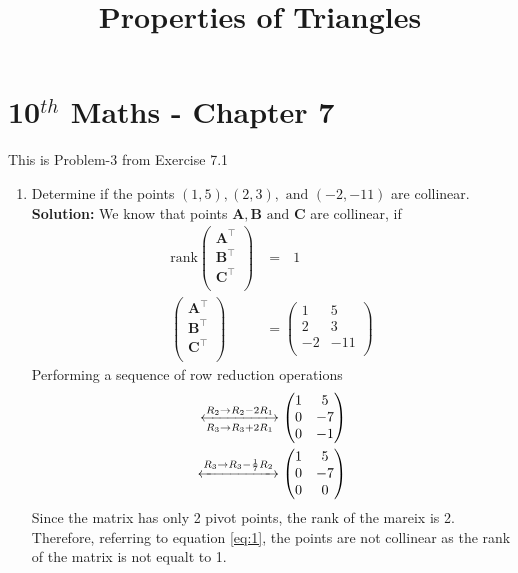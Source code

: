 \documentclass[12pt]{article}
\newcommand{\solution}{\noindent \textbf{Solution: }}
\newcommand{\myvec}[1]{\ensuremath{\begin{pmatrix}#1\end{pmatrix}}}
\let\vec\mathbf
\begin{document}
\begin{center}
\title{\textbf{Properties of Triangles}}
\date{\vspace{-5ex}} %
\maketitle
\end{center}
\setcounter{page}{1}

\section{10$^{th}$ Maths - Chapter 7}
This is Problem-3 from Exercise 7.1
\begin{enumerate}
\item Determine if the points $(1,5), (2,3), \text{ and } (-2,-11)$ are collinear.  \\
\solution 
 We know that points $\vec{A}, \vec{B} \text{ and } \vec{C}$ are collinear, if
\begin{align}
  \label{eq:1}
\text{rank}\myvec{ 
	\vec{A}^\top \\ 
	\vec{B}^\top \\ 
	\vec{C}^\top \\
}    &= \text{ } 1 \\   
	\myvec{ \vec{A}^\top \\ 
			\vec{B}^\top \\ 
			\vec{C}^\top \\
} &=   		\myvec{
        		1 & 5 \\
        		2 & 3 \\
        		-2 & -11 \\
}
\end{align}
Performing a sequence of row reduction operations \\
\begin{align}
\xleftrightarrow[{R_3\rightarrow R_3+2R_1}]{{R_2\rightarrow R_2-2R_1}}  \myvec{
  1 & 5 \\
  0 & -7 \\
  0 & -1 \\
}    \\
\xleftrightarrow[]{{R_3\rightarrow R_3-\frac{1}{7}R_2}}  \myvec{
  1 & 5 \\
  0 & -7 \\
  0 & 0 \\
}
\end{align}
Since the matrix has only 2 pivot points, the rank of the mareix is 2. Therefore, referring to equation \ref{eq:1}, the points are not collinear as the rank of the matrix is not equalt to 1. \\

\end{enumerate}
\end{document}

